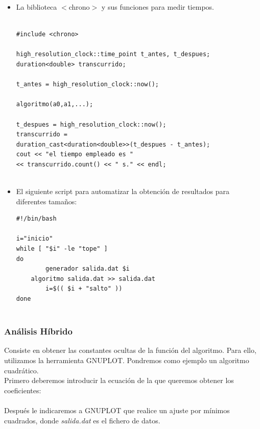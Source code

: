 \documentclass[a4paper,12pt,twoside]{article} %
\begin{document}
\begin{itemize}
	\item La biblioteca $<$chrono$>$ y sus funciones para medir tiempos.
	
	\lstset{language=C++}
	\begin{lstlisting}

#include <chrono>
	
high_resolution_clock::time_point t_antes, t_despues;
duration<double> transcurrido;

t_antes = high_resolution_clock::now();

algoritmo(a0,a1,...);

t_despues = high_resolution_clock::now();
transcurrido = 
duration_cast<duration<double>>(t_despues - t_antes);
cout << "el tiempo empleado es " 
<< transcurrido.count() << " s." << endl;
	
	\end{lstlisting}
	
\vspace{1cm}

	\item El siguiente script para automatizar la obtención de resultados para diferentes tamaños:

	\lstset{language=Bash}
	\begin{lstlisting}
#!/bin/bash 

i="inicio"
while [ "$i" -le "tope" ]
do
        generador salida.dat $i
 	algoritmo salida.dat >> salida.dat
        i=$(( $i + "salto" ))
done
      

	\end{lstlisting}
	
\end{itemize}

\newpage
\subsubsection{Análisis Híbrido}

Consiste en obtener las constantes ocultas de la función del algoritmo. Para ello, utilizamos la herramienta GNUPLOT. Pondremos como ejemplo un algoritmo cuadrático.\\

Primero deberemos introducir la ecuación de la que queremos obtener los coeficientes:\\

\\

Después le indicaremos a GNUPLOT que realice un ajuste por mínimos cuadrados, donde \textit{salida.dat} es el fichero de datos.\\
\end{document}
